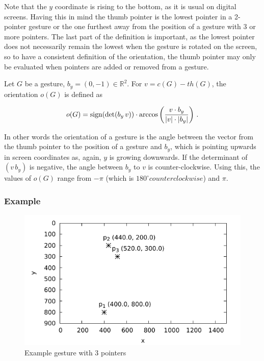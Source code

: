 Note that the $y$ coordinate is rising to the bottom, as it is usual on digital screens. Having this in mind the thumb pointer is the lowest pointer in a 2-pointer gesture or the one furthest away from the position of a gesture with 3 or more pointers. The last part of the definition is important, as the lowest pointer does not necessarily remain the lowest when the gesture is rotated on the screen, so to have a consistent definition of the orientation, the thumb pointer may only be evaluated when pointers are added or removed from a gesture.

\begin{defn}
	Let $G$ be a gesture, $b_y = (0, -1) \in \mathbb{R}^2$. For $v = c(G) - th(G)$, the orientation $o(G)$ is defined as
	
\begin{equation}
o(G) = \textnormal{sign}(\det(b_y\, v)) \cdot \arccos\left(\frac{v \cdot b_y}{|v| \cdot |b_y|}\right) \, .
\end{equation}	

\end{defn}


In other words the orientation of a gesture is the angle between the vector from the thumb pointer to the position of a gesture and $b_y$, which is pointing upwards in screen coordinates as, again, $y$ is growing downwards. If the determinant of $(v\,b_y)$ is negative, the angle between $b_y$ to $v$ is counter-clockwise\cite{Bronstein2012}. Using this, the values of $o(G)$ range from $-\pi$ (which is $180^\circ counterclockwise$) and $\pi$. 

\subsubsection{Example}

\begin{figure}
	\caption{\label{fig:touch:expl}Example gesture with 3 pointers}
	\includegraphics{assets/chpt_concepts/gestures/3pointers_blank.pdf}
\end{figure}

